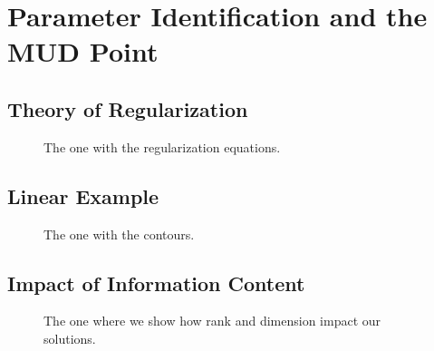 \section{Parameter Identification and the MUD Point}


\subsection{Theory of Regularization}

\begin{frame}[t]
\centering
\begin{figure}
\centering

The one with the regularization equations.

\end{figure}

\end{frame}

\subsection{Linear Example}

\begin{frame}[t]
\centering
\begin{figure}
\centering

The one with the contours.

\end{figure}

\end{frame}

\subsection{Impact of Information Content}

\begin{frame}[t]
\centering
\begin{figure}
\centering

The one where we show how rank and dimension impact our solutions.

\end{figure}

\end{frame}


